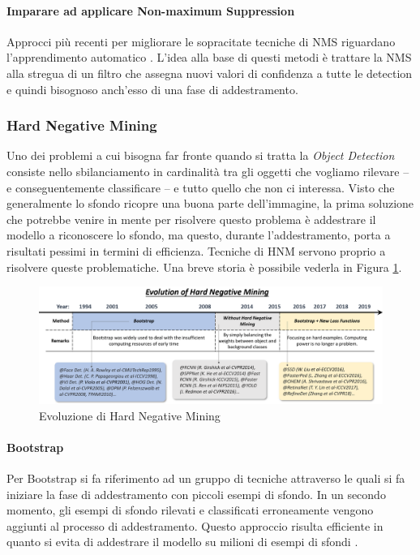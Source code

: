 \paragraph{Imparare ad applicare Non-maximum Suppression}
Approcci più recenti per migliorare le sopracitate tecniche di \ac{NMS} riguardano l'apprendimento automatico \cite{wan2015end, desai2011discriminative, hosang2017learning, henderson2016end}. L'idea alla base di questi metodi è trattare la \ac{NMS} alla stregua di un filtro che assegna nuovi valori di confidenza a tutte le detection e quindi bisognoso anch'esso di una fase di addestramento. 

\subsubsection{Hard Negative Mining}
Uno dei problemi a cui bisogna far fronte quando si tratta la \textit{Object Detection} consiste nello sbilanciamento in cardinalità tra gli oggetti che vogliamo rilevare -- e conseguentemente classificare -- e tutto quello che non ci interessa. Visto che generalmente lo sfondo ricopre una buona parte dell'immagine, la prima soluzione che potrebbe venire in mente per risolvere questo problema è addestrare il modello a riconoscere lo sfondo, ma questo, durante l'addestramento, porta a risultati pessimi in termini di efficienza. Tecniche di \ac{HNM} servono proprio a risolvere queste problematiche. Una breve storia è possibile vederla in Figura \ref{fig:HNM_history}.
\begin{figure}
    \centering
    \includegraphics[width=\textwidth]{images/evol-hardnegmining.png}
    \caption{Evoluzione di Hard Negative Mining \cite{DBLP:journals/corr/abs-1905-05055}}
    \label{fig:HNM_history}
\end{figure}
\paragraph{Bootstrap}
Per Bootstrap si fa riferimento ad un gruppo di tecniche attraverso le quali si fa iniziare la fase di addestramento con piccoli esempi di sfondo. 
In un secondo momento, gli esempi di sfondo rilevati e classificati erroneamente vengono aggiunti al processo di addestramento. Questo approccio risulta efficiente in quanto si evita di addestrare il modello su milioni di esempi di sfondi \cite{viola2001rapid, papageorgiou1998general, rowley1996human}.
